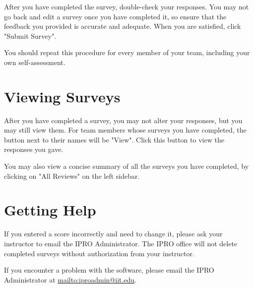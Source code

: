 \documentclass{article}
\begin{document}
After you have completed the survey, double-check your responses. You may not go back and edit a survey once you have completed it, so ensure that the feedback you provided is accurate and adequate. When you are satisfied, click "Submit Survey".

You should repeat this procedure for every member of your team, including your own self-assessment.

\section{Viewing Surveys}

After you have completed a survey, you may not alter your responses, but you may still view them. For team members whose surveys you have completed, the button next to their names will be "View". Click this button to view the responses you gave.

You may also view a concise summary of all the surveys you have completed, by clicking on "All Reviews" on the left sidebar.

\section{Getting Help}

If you entered a score incorrectly and need to change it, please ask your instructor to email the IPRO Administrator. The IPRO office will not delete completed surveys without authorization from your instructor.

If you encounter a problem with the software, please email the IPRO Administrator at \url{mailto:iproadmin@iit.edu}.
\end{document}
